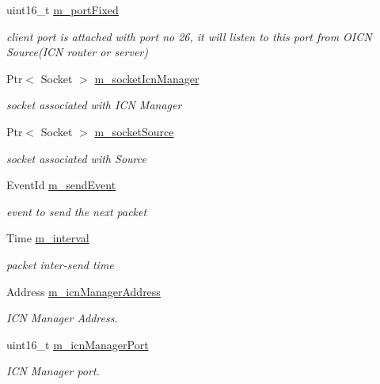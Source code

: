 \begin{DoxyCompactItemize}
uint16\-\_\-t \hyperlink{classns3_1_1OICNZipfClient_a9f6a96310cf93dd8233c3f8c7c9bf298}{m\-\_\-port\-Fixed}
\begin{DoxyCompactList}\small\item\em client port is attached with port no 26, it will listen to this port from O\-I\-C\-N Source(\-I\-C\-N router or server) \end{DoxyCompactList}\item 
Ptr$<$ Socket $>$ \hyperlink{classns3_1_1OICNZipfClient_accb08afc8f8218076eaa919743381e79}{m\-\_\-socket\-Icn\-Manager}
\begin{DoxyCompactList}\small\item\em socket associated with I\-C\-N Manager \end{DoxyCompactList}\item 
Ptr$<$ Socket $>$ \hyperlink{classns3_1_1OICNZipfClient_ada2f1cccaed0a70bf548ad789669a2f6}{m\-\_\-socket\-Source}
\begin{DoxyCompactList}\small\item\em socket associated with Source \end{DoxyCompactList}\item 
Event\-Id \hyperlink{classns3_1_1OICNZipfClient_ae3d2dfdcf8327811fd5f2def89214b21}{m\-\_\-send\-Event}
\begin{DoxyCompactList}\small\item\em event to send the next packet \end{DoxyCompactList}\item 
Time \hyperlink{classns3_1_1OICNZipfClient_a916a69a684a6422b37ee520c499430e9}{m\-\_\-interval}
\begin{DoxyCompactList}\small\item\em packet inter-\/send time \end{DoxyCompactList}\item 
Address \hyperlink{classns3_1_1OICNZipfClient_af1bb1bbc3778f4b0deff03288e1cd56f}{m\-\_\-icn\-Manager\-Address}
\begin{DoxyCompactList}\small\item\em I\-C\-N Manager Address. \end{DoxyCompactList}\item 
uint16\-\_\-t \hyperlink{classns3_1_1OICNZipfClient_a9f0e99cf57dbab4950612c6eecfdeb8c}{m\-\_\-icn\-Manager\-Port}
\begin{DoxyCompactList}\small\item\em I\-C\-N Manager port. \end{DoxyCompactList}\end{DoxyCompactItemize}


